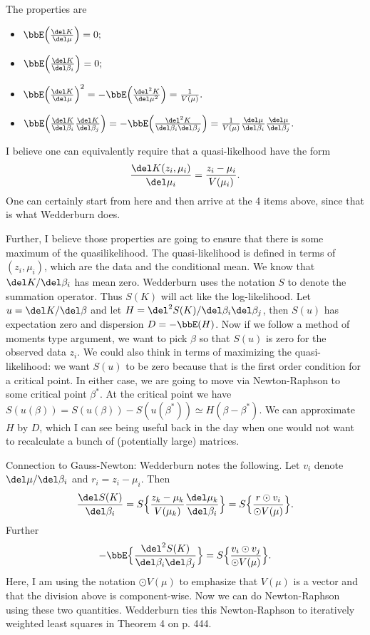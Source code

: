 \documentclass{article}
\newcommand{\graddel}[2]{\frac{\del #1}{\del #2}}
\newcommand{\hessdel}[3]{\frac{\del^2 #1}{\del #2 \del #3}}
\begin{document}
The properties are
\begin{itemize}
\item 
  \(
  \bbE \Big( \graddel{K}{\mu} \Big) = 0;
  \)
  
\item
  \(
  \bbE \Big( \graddel{K}{\beta_i} \Big) = 0;
  \)

\item 
  \(
  \bbE \Big( \graddel{K}{\mu} \Big)^2 = - \bbE \Big( \frac{\del^2 K}{\del \mu^2}
  \Big) = \frac{1}{V(\mu)}.
  \)

\item 
  \(
  \bbE \Big( \graddel{K}{\beta_i} \graddel{K}{\beta_j} \Big)
  = - \bbE \Big( \hessdel{K}{\beta_i}{\beta_j} \Big) 
  = \frac{1}{V(\mu)} \graddel{\mu}{\beta_i} \graddel{\mu}{\beta_j}.
  \)
\end{itemize}
I believe one can equivalently require that a quasi-likelhood have the form
\[
\frac{\del K(z_i, \mu_i)}{\del \mu_i} = \frac{z_i - \mu_i}{V(\mu_i)}.
\]
One can certainly start from here and then arrive at the 4 items above, since
that is what Wedderburn does.

Further, I believe those properties are going to ensure that there is some
maximum of the quasilikelihood.  The quasi-likelihood is defined in terms of
$(z_i, \mu_i)$, which are the data and the conditional mean.  We know that $\del
K / \del \beta_i$ has mean zero.  Wedderburn uses the notation $S$ to denote the
summation operator.  Thus $S(K)$ will act like the log-likelihood.  Let $u =
\del K / \del \beta$ and let $H = \del^2 S(K) / \del \beta_i \del \beta_j$, then
$S(u)$ has expectation zero and dispersion $D = - \bbE(H)$.  Now if we follow a
method of moments type argument, we want to pick $\beta$ so that $S(u)$ is zero
for the observed data $z_i$.  We could also think in terms of maximizing the
quasi-likelihood: we want $S(u)$ to be zero because that is the first order
condition for a critical point.  In either case, we are going to move via
Newton-Raphson to some critical point $\beta^*$.  At the critical point we have
$S(u(\beta)) = S(u(\beta)) - S(u(\beta^*)) \simeq H(\beta - \beta^*)$.  We can
approximate $H$ by $D$, which I can see being useful back in the day when one
would not want to recalculate a bunch of (potentially large) matrices.

Connection to Gauss-Newton: Wedderburn notes the following.  Let $v_i$ denote
$\del \mu / \del \beta_i$ and $r_i = z_i - \mu_i$.  Then
\[
\graddel{S(K)}{\beta_i} = S \Big\{ \frac{z_k - \mu_k}{V(\mu_k)} \frac{\del
  \mu_k}{ \del \beta_i} \Big\} = S \Big\{ \frac{r \odot v_i}{\odot V(\mu)} \Big\}.
\]
Further
\[
- \bbE \Big\{ \hessdel{S(K)}{\beta_i}{\beta_j} \Big\} = S \Big\{ \frac{v_i
  \odot v_j}{\odot V(\mu)} \Big\}.
\]
Here, I am using the notation $\odot V(\mu)$ to emphasize that $V(\mu)$ is a
vector and that the division above is component-wise.  Now we can do
Newton-Raphson using these two quantities.  Wedderburn ties this Newton-Raphson
to iteratively weighted least squares in Theorem 4 on p. 444.
\end{document}
